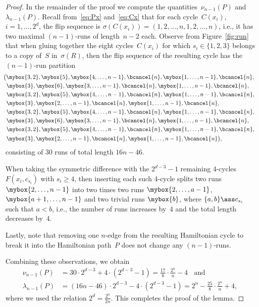 \documentclass[a4paper,11pt,reqno]{amsart}
\begin{document}
\begin{proof}
In the remainder of the proof we compute the quantities~$\nu_{n-1}(P)$ and~$\lambda_{n-1}(P)$.
Recall from~\eqref{eq:Px} and~\eqref{eq:Cx} that for each cycle~$C(x_i)$, $i=1,\ldots,2^d$, the flip sequence is $\sigma(C(x_i))=(1,2,\ldots,n,1,2,\ldots,n)$, i.e., it has two maximal $(n-1)$-runs of length~$n-2$ each.
Observe from Figure~\ref{fig:run} that when gluing together the eight cycles~$C(x_i)$ for which $s_i\in\{1,2,3\}$ belongs to a copy of~$S$ in~$\sigma(R)$, then the flip sequence of the resulting cycle has the $(n-1)$-run partition
\begin{alignat*}{8}
   & \!\!\!\big(\mybox{3,2},\mybox{5},\mybox{4,\dots,n-1},\bcancel{n},\mybox{1,\dots,n-1},\bcancel{n}, \\
   & \mybox{3},\mybox{6},\mybox{3,\dots,n-1},\bcancel{n},\mybox{1,\dots,n-1},\bcancel{n}, \\
   & \mybox{3,2},\mybox{5},\mybox{4,\dots,n-1},\bcancel{n},\mybox{1,\dots,n-1},\bcancel{n}, \\
   & \mybox{3},\mybox{2,\dots,n-1},\bcancel{n},\mybox{1,\dots,n-1},\bcancel{n},\\
   & \mybox{3,2},\mybox{5},\mybox{4,\dots,n-1},\bcancel{n},\mybox{1,\dots,n-1},\bcancel{n}, \\
   & \mybox{3},\mybox{6},\mybox{3,\dots,n-1},\bcancel{n},\mybox{1,\dots,n-1},\bcancel{n},\\
   & \mybox{3,2},\mybox{5},\mybox{4,\dots,n-1},\bcancel{n},\mybox{1,\dots,n-1},\bcancel{n},\\
   & \mybox{3},\mybox{2,\dots,n-1},\bcancel{n},\mybox{1,\dots,n-1},\bcancel{n}\big),
\end{alignat*}
consisting of 30 runs of total length $16n-46$.

When taking the symmetric difference with the $2^{d-3}-1$ remaining 4-cycles $F(x_i,c_{s_i})$ with $s_i\geq 4$, then inserting each such 4-cycle splits two runs $\mybox{2,\dots,n-1}$ into two times two runs $\mybox{2,\dots,a-1}$, $\mybox{a+1,\dots,n-1}$ and two trivial runs $\mybox{b}$, where $\{a,b\}\ass c_{s_i}$ such that $a<b$, i.e., the number of runs increases by~4 and the total length decreases by~4.

Lastly, note that removing one $n$-edge from the resulting Hamiltonian cycle to break it into the Hamiltonian path~$P$ does not change any $(n-1)$-runs.

Combining these observations, we obtain
\begin{equation*}
\begin{split}
\nu_{n-1}(P) &= 30\cdot 2^{d-3}+4\cdot(2^{d-3}-1)=\frac{17}{8}\cdot\frac{2^n}{n}-4 \;\;\text{ and } \\
\lambda_{n-1}(P) &= (16n-46)\cdot2^{d-3}-4\cdot(2^{d-3}-1)=2^n-\frac{25}{8}\cdot \frac{2^n}{n}+4,
\end{split}
\end{equation*}
where we used the relation $2^d=\frac{2^n}{2n}$.
This completes the proof of the lemma.
\end{proof}
\end{document}
